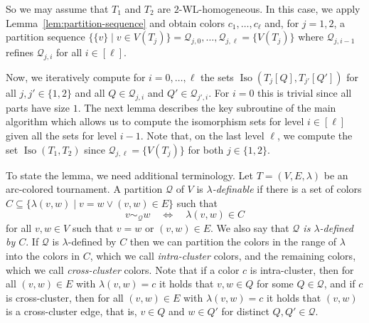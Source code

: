 \PassOptionsToPackage{dvipsnames,svgnames}{xcolor}\documentclass[10pt,a4paper]{article}
\newcommand{\CQ}{{\mathcal Q}}
\DeclareMathOperator{\Iso}{Iso}
\begin{document}
So we may assume that $T_1$ and $T_2$ are $2$-WL-homogeneous.
In this case, we apply Lemma~\ref{lem:partition-sequence} and obtain colors $c_1,\ldots,c_\ell$ and, for $j=1,2$, a partition sequence $\{\{v\} \mid v \in V(T_j)\} = \CQ_{j,0}, \dots, \CQ_{j,\ell} = \{V(T_j)\}$ where $\CQ_{j,i-1}$ refines $\CQ_{j,i}$ for all $i \in [\ell]$.

Now, we iteratively compute for $i=0,\dots,\ell$ the sets $\Iso(T_j[Q],T_{j'}[Q'])$ for all $j,j' \in \{1,2\}$ and all $Q \in \CQ_{j,i}$ and $Q' \in \CQ_{j',i}$.
For $i = 0$ this is trivial since all parts have size $1$.
The next lemma describes the key subroutine of the main algorithm which allows us to compute the isomorphism sets for level $i \in [\ell]$ given all the sets for level $i-1$.
Note that, on the last level $\ell$, we compute the set $\Iso(T_1,T_2)$ since $\CQ_{j,\ell} = \{V(T_j)\}$ for both $j \in \{1,2\}$.

To state the lemma, we need additional terminology.
Let $T = (V,E,\lambda)$ be an arc-colored tournament.
A partition $\CQ$ of $V$ is \emph{$\lambda$-definable} if there is a set of colors $C \subseteq \{\lambda(v,w) \mid v= w \vee (v,w) \in E\}$ such that
\[v \sim_\CQ w \quad\iff\quad \lambda(v,w) \in C\]
for all $v,w \in V$ such that $v = w$ or $(v,w) \in E$.
We also say that \emph{$\CQ$ is $\lambda$-defined by $C$}.
If $\CQ$ is $\lambda$-defined by $C$ then we can partition the colors in the range of $\lambda$ into the colors in $C$, which we call \emph{intra-cluster} colors, and the remaining colors, which we call \emph{cross-cluster} colors.
Note that if a color $c$ is intra-cluster, then for all $(v,w) \in E$ with $\lambda(v,w) = c$ it holds that $v,w \in Q$ for some $Q \in \CQ$,
and if $c$ is cross-cluster, then for all $(v,w) \in E$ with $\lambda(v,w) = c$ it holds that $(v,w)$ is a cross-cluster edge, that is, $v \in Q$ and $w \in Q'$ for distinct $Q,Q' \in \CQ$.
\end{document}
